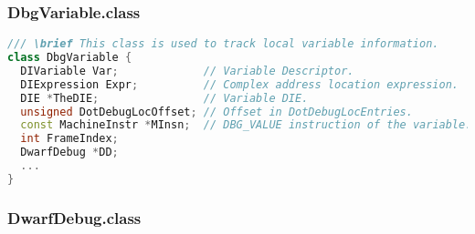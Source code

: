 \documentclass{ctexart}
\begin{document}
\subsubsection{DbgVariable.class}
\begin{lstlisting}[language=C++]
/// \brief This class is used to track local variable information.
class DbgVariable {
  DIVariable Var;             // Variable Descriptor.
  DIExpression Expr;          // Complex address location expression.
  DIE *TheDIE;                // Variable DIE.
  unsigned DotDebugLocOffset; // Offset in DotDebugLocEntries.
  const MachineInstr *MInsn;  // DBG_VALUE instruction of the variable.
  int FrameIndex;
  DwarfDebug *DD;
  ...
}
\end{lstlisting}


\subsubsection{DwarfDebug.class}
\end{document}
